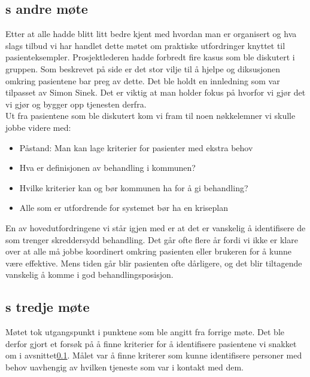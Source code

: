 \documentclass[11pt]{report} %
\begin{document}
                  \subsection{s andre møte}\label{sec:agr_2}
                    Etter at alle hadde blitt litt bedre kjent med hvordan man er organisert og hva slags tilbud vi har handlet dette møtet om praktiske utfordringer knyttet til pasienteksempler. Prosjektlederen hadde forbredt fire kasus som ble diskutert i gruppen. Som beskrevet på side \pageref{stor_vilje_til_hjelp} er det stor vilje til å hjelpe og diksusjonen omkring pasientene bar preg av dette\cite{arbgr_mref-2}. Det ble holdt en innledning som var tilpasset av Simon Sinek\cite{sinek09}. Det er viktig at man holder fokus på hvorfor vi gjør det vi gjør og bygger opp tjenesten derfra. \\
                    Ut fra pasientene som ble diskutert kom vi fram til noen nøkkelemner vi skulle jobbe videre med:\\
                      \begin{itemize}
                        \item Påstand: Man kan lage kriterier for pasienter med ekstra behov\\
                        \item Hva er definisjonen av behandling i kommunen?\\
                        \item Hvilke kriterier kan og bør kommunen ha for å gi behandling?\\
                        \item Alle som er utfordrende for systemet bør ha en kriseplan\\
                      \end{itemize}
                    En av hovedutfordringene vi står igjen med er at det er vanskelig å identifisere de som trenger skreddersydd behandling. Det går ofte flere år fordi vi ikke er klare over at alle må jobbe koordinert omkring pasienten eller brukeren for å kunne være effektive. Mens tiden går blir pasienten ofte dårligere, og det blir tiltagende vanskelig å komme i god behandlingsposisjon.   

                  \subsection{s tredje møte}\label{sec:agr_3}
                    Møtet tok utgangspunkt i punktene som ble angitt fra forrige møte\cite{arbgr_mref-2}. Det ble derfor gjort et forsøk på å finne kriterier for å identifisere pasientene vi snakket om i avsnittet\ref{sec:agr_2}. Målet var å finne kriterer som kunne identifisere personer med behov uavhengig av hvilken tjeneste som var i kontakt med dem. \\
\end{document}
